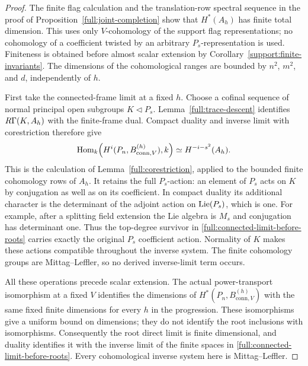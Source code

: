 \begin{proof}
The finite flag calculation and the translation-row spectral
sequence in the proof of
Proposition~\ref{full:joint-completion} show that $H^*(A_h)$
has finite total dimension.
This uses only $V$-cohomology of the support flag representations;
no cohomology of a coefficient twisted by an arbitrary
$P_s$-representation is used.
Finiteness is obtained before almost scalar extension by
Corollary~\ref{support:finite-invariants}.
The dimensions of the cohomological ranges are bounded by
$n^2$, $m^2$, and $d$, independently of $h$.

First take the connected-frame limit at a fixed $h$.
Choose a cofinal sequence of normal principal open subgroups
$K\triangleleft P_s$.
Lemma~\ref{full:trace-descent} identifies
$R\Gamma(K,A_h)$ with the finite-frame dual.
Compact duality and inverse limit with corestriction therefore give
\begin{equation}
\label{full:connected-limit-before-roots}
 \operatorname{Hom}_k\!\left(
      H^i(P_n,B_{\mathrm{conn},V}^{(h)}),k\right)
       \simeq H^{-i-s^2}(A_h).
\end{equation}
This is the calculation of Lemma~\ref{full:corestriction},
applied to the bounded finite cohomology rows of $A_h$.
It retains the full $P_s$-action: an element of $P_s$ acts
on $K$ by conjugation as well as on its coefficient.
In compact duality its additional character is the determinant
of the adjoint action on $\operatorname{Lie}(P_s)$, which is one.
For example, after a splitting field extension the Lie algebra is
$M_s$ and conjugation has determinant one.
Thus the top-degree survivor in
\eqref{full:connected-limit-before-roots} carries exactly the
original $P_s$ coefficient action.
Normality of $K$ makes these actions compatible throughout the
inverse system.
The finite cohomology groups are Mittag--Leffler, so no derived
inverse-limit term occurs.

All these operations precede scalar extension.
The actual power-transport isomorphism at a fixed $V$ identifies
the dimensions of
$H^*(P_n,B_{\mathrm{conn},V}^{(h)})$
with the same fixed finite dimensions for every $h$ in the
progression.  These isomorphisms give a uniform bound on dimensions;
they do not identify the root inclusions with isomorphisms.
Consequently the root direct limit is finite dimensional, and
duality identifies it with the inverse limit of the finite
spaces in \eqref{full:connected-limit-before-roots}.
Every cohomological inverse system here is Mittag--Leffler.


\end{proof}
